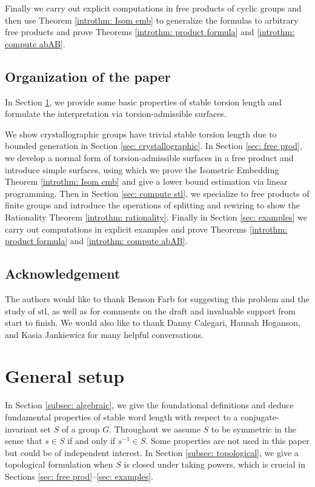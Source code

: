 \documentclass{amsart}
\theoremstyle{definition}
\numberwithin{equation}{section}
\theoremstyle{theorem}
\theoremstyle{remark}
\def\stl{\mathrm{stl}}
\begin{document}
	Finally we carry out explicit computations in free products of cyclic groups
	and then use Theorem \ref{introthm: Isom emb} to generalize the formulas to arbitrary free products and prove 
	Theorems \ref{introthm: product formula} and \ref{introthm: compute abAB}.
    
	\subsection{Organization of the paper}
	In Section \ref{sec: background}, we provide some basic properties of stable torsion length and formulate the interpretation via torsion-admissible surfaces.
	
	We show crystallographic groups have trivial stable torsion length due to bounded generation in Section \ref{sec: crystallographic}.
	In Section \ref{sec: free prod}, we develop a normal form of torsion-admissible surfaces in a free product and introduce simple surfaces, 
	using which we prove the Isometric Embedding Theorem \ref{introthm: Isom emb} and give a lower bound estimation via linear programming.
	Then in Section \ref{sec: compute stl}, we specialize to free products of finite groups and introduce the operations of splitting and rewiring to 
	show the Rationality Theorem \ref{introthm: rationality}.
	Finally in Section \ref{sec: examples} we carry out computations in explicit examples and prove Theorems \ref{introthm: product formula} and \ref{introthm: compute abAB}.
	
	\subsection*{Acknowledgement}
	The authors would like to thank Benson Farb for suggesting this problem and the study of $\stl$, as well as for comments on the draft and invaluable support from start to finish. We would also like to thank Danny Calegari, Hannah Hoganson, and Kasia Jankiewicz for many helpful conversations.
	
	
	\section{General setup}\label{sec: background}
	In Section \ref{subsec: algebraic}, we give the foundational definitions and deduce fundamental properties of stable word length with respect to a conjugate-invariant set $S$ of a group $G$. 
	Throughout we assume $S$ to be symmetric in the sense that $s\in S$ if and only if $s^{-1}\in S$.
	Some properties are not used in this paper but could be of independent interest.
	In Section \ref{subsec: topological}, we give a topological formulation when $S$ is closed under taking powers, which is crucial in Sections \ref{sec: free prod}--\ref{sec: examples}.
	
\end{document}

